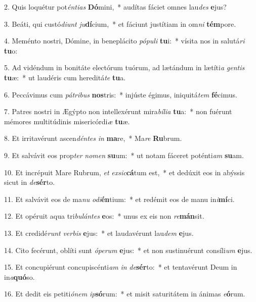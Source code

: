 2. Quis loquétur pot\textit{én}\textit{ti}\textit{as} \textbf{Dó}mini,~*  audítas fáciet omnes lau\textit{des} \textbf{e}jus?\

3. Beáti, qui custó\textit{di}\textit{unt} \textit{ju}\textbf{dí}cium,~*  et fáciunt justítiam in om\textit{ni} \textbf{tém}pore.\

4. Meménto nostri, Dómine, in beneplácito \textit{pó}\textit{pu}\textit{li} \textbf{tu}i:~*  vísita nos in salutá\textit{ri} \textbf{tu}o:\

5. Ad vidéndum in bonitáte electórum tuórum, ad lætándum in lætíti\textit{a} \textit{gen}\textit{tis} \textbf{tu}æ:~*  ut laudéris cum hereditá\textit{te} \textbf{tu}a.\

6. Peccávimus cum \textit{pá}\textit{tri}\textit{bus} \textbf{nos}tris:~*  injúste égimus, iniquitá\textit{tem} \textbf{fé}cimus.\

7. Patres nostri in Ægýpto non intellexérunt mira\textit{bí}\textit{li}\textit{a} \textbf{tu}a:~*  non fuérunt mémores multitúdinis misericórdi\textit{æ} \textbf{tu}æ.\

8. Et irritavérunt ascen\textit{dén}\textit{tes} \textit{in} \textbf{ma}re,~*  Ma\textit{re} \textbf{Ru}brum.\

9. Et salvávit eos prop\textit{ter} \textit{no}\textit{men} \textbf{su}um:~*  ut notam fáceret poténti\textit{am} \textbf{su}am.\

10. Et incrépuit Mare Rubrum, \textit{et} \textit{ex}\textit{sic}\textbf{cá}tum est,~*  et dedúxit eos in abýssis sicut in \textit{de}\textbf{sér}to.\

11. Et salvávit eos de ma\textit{nu} \textit{o}\textit{di}\textbf{én}tium:~*  et redémit eos de manu in\textit{i}\textbf{mí}ci.\

12. Et opéruit aqua tri\textit{bu}\textit{lán}\textit{tes} \textbf{e}os:~*  unus ex eis non \textit{re}\textbf{mán}sit.\

13. Et credidé\textit{runt} \textit{ver}\textit{bis} \textbf{e}jus:~*  et laudavérunt lau\textit{dem} \textbf{e}jus.\

14. Cito fecérunt, oblíti sunt \textit{ó}\textit{pe}\textit{rum} \textbf{e}jus:~*  et non sustinuérunt consíli\textit{um} \textbf{e}jus.\

15. Et concupiérunt concupiscénti\textit{am} \textit{in} \textit{de}\textbf{sér}to:~*  et tentavérunt Deum in in\textit{a}\textbf{quó}so.\

16. Et dedit eis petiti\textit{ó}\textit{nem} \textit{ip}\textbf{só}rum:~*  et misit saturitátem in ánimas \textit{e}\textbf{ó}rum.\


